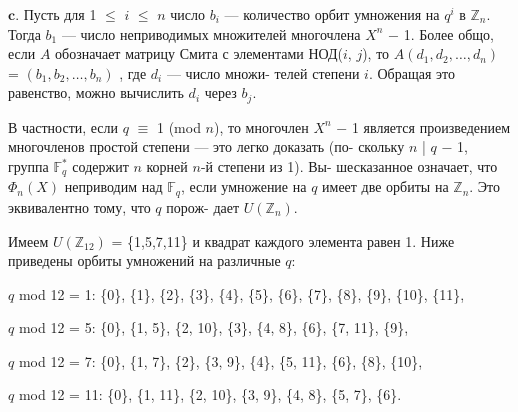 \vspace{3pt}$\mathbf{c.}$ Пусть для 1 $\leqslant$ $i$ $\leqslant$ $n$ число $b_{i}$ ---  количество орбит умножения \linebreak
на $q^{i}$ в $\mathbb Z_n$. Тогда $b_{1}$ --- число неприводимых множителей многочлена \linebreak
$X^{n}$ $-$ 1. Более общо, если $A$  обозначает матрицу Смита с элементами \linebreak
НОД($i$, $j$), то $A(d_{1}, d_{2}, \dots, d_{n})$ = $(b_{1}, b_{2}, \dots, b_{n})$ ,  где $d_{i}$ --- число множи­- \linebreak
телей степени $i$. Обращая это равенство, можно вычислить $d_{i}$ через $b_{j}$. \ 

\vspace{1pt} В частности, если $q$ $\equiv$ 1 (mod $n$), то многочлен $X^{n}$ $-$ 1 является \linebreak
произведением многочленов простой степени --- это легко доказать (по­- \linebreak
скольку $n$ | $q$ $-$ 1, группа $\mathbb F^*_q$ содержит $n$ корней $n$-й степени из 1). Вы­- \linebreak
шесказанное означает, что $\Phi_n(X)$ неприводим над  $\mathbb F_q$, если умножение \linebreak
на $q$ имеет две орбиты на  $\mathbb Z_n$. Это эквивалентно тому, что $q$ порож­- \linebreak
дает $U(\mathbb Z_n)$.

\newpage


Имеем $U(\mathbb Z_{12})$ = \{1,5,7,11\} и квадрат каждого элемента равен 1. \linebreak
Ниже приведены орбиты умножений на различные $q$:

\begin{flushleft}
\hspace{15pt} $q$ \small mod 12 = 1: \small\{0\}, \{1\}, \{2\}, \{3\}, \{4\}, \{5\}, \{6\}, \{7\}, \{8\}, \{9\}, \{10\}, \{11\},\ 

\vspace{0pt}\hspace{15pt} $q$ \small mod 12 = 5: \small\{0\}, \{1, 5\}, \{2, 10\}, \{3\}, \{4, 8\}, \{6\}, \{7, 11\}, \{9\}, \ 

\vspace{0pt}\hspace{15pt} $q$ \small mod 12 = 7: \small\{0\}, \{1, 7\}, \{2\}, \{3, 9\}, \{4\}, \{5, 11\}, \{6\}, \{8\}, \{10\}, \ 

\vspace{0pt}\hspace{7pt} $q$ \small mod 12 = 11: \small\{0\}, \{1, 11\}, \{2, 10\}, \{3, 9\}, \{4, 8\}, \{5, 7\}, \{6\}.
\end{flushleft}

